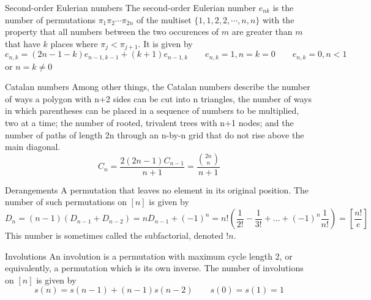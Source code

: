 \begin{algorithm}{Second-order Eulerian numbers}
\desc
The second-order Eulerian number $e_{nk}$ is the number of
permutations $\pi_1 \pi_2 \cdots \pi_{2n}$ of the multiset
$\{1,1,2,2,\cdots,n,n\}$ with the property that all numbers between
the two occurences of $m$ are greater than $m$ that have $k$ places
where $\pi_j < \pi_{j+1}$. It is given by
$$e_{n,k} = (2n-1-k)e_{n-1,k-1} + (k+1) e_{n-1, k} \qquad e_{n,k} = 1, n = k = 0 \qquad e_{n,k} = 0, n < 1$$ or $n = k \ne 0$
\end{algorithm}

\begin{algorithm}{Catalan numbers}
\keyword{}
\desc
Among other things, the Catalan numbers describe the number of ways a polygon
with n+2 sides can be cut into n triangles, the number of ways in which
parentheses can be placed in a sequence of numbers to be multiplied, two at
a time; the number of rooted, trivalent trees with n+1 nodes; and the number
of paths of length 2n through an n-by-n grid that do not rise above the
main diagonal.
$$C_n = \frac{2(2n-1)C_{n-1}}{n+1} = \frac{\binom{2n}{n}}{\scriptstyle n+1}$$
\end{algorithm}

\begin{algorithm}{Derangements}
\keyword{}
\desc
A permutation that leaves no element in its original position.  The
number of such permutations on $[n]$ is given by
$$D_n = (n-1)(D_{n-1}+D_{n-2}) = nD_{n-1} + (-1)^n = n!\left(\frac
1{2!}-\frac 1{3!}+\ldots+(-1)^n\frac 1{n!}\right) =
\left[\frac{n!}{e}\right]$$
This number is sometimes called the subfactorial, denoted $!n$.
\end{algorithm}

\begin{algorithm}{Involutions}
\keyword{}
\desc
An involution is a permutation with maximum cycle length 2, or
equivalently, a permutation which is its own inverse.  The number of
involutions on $[n]$ is given by
$$s(n) = s(n-1) + (n-1)s(n-2) \qquad s(0) = s(1) = 1$$
\end{algorithm}

